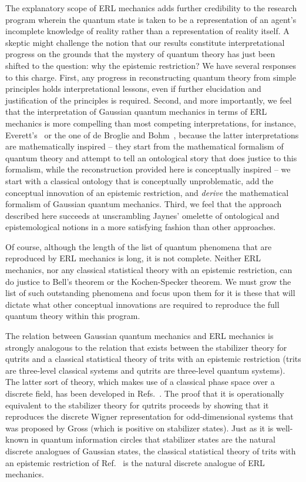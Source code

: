\documentclass[pra,superscriptaddress,nofootinbib,12pt]{revtex4-2}
\begin{document}
The explanatory scope of ERL mechanics adds further credibility to the research program wherein the quantum state is taken to be a representation of an agent's incomplete knowledge of reality rather than a representation of reality itself. A skeptic might challenge the notion that our results constitute interpretational progress on the grounds that the mystery of quantum theory has just been shifted to the question: why the epistemic restriction?  We have several responses to this charge.  First, any progress in reconstructing quantum theory from simple principles holds interpretational lessons, even if further elucidation and justification of the principles is required.  Second, and more importantly, we feel that the interpretation of Gaussian quantum mechanics in terms of ERL mechanics is more compelling than most competing interpretations, for instance, Everett's~\cite{Everett} or the one of de Broglie and Bohm~\cite{Bohmian}, because the latter interpretations are mathematically inspired -- they start from the mathematical formalism of quantum theory and attempt to tell an ontological story that does justice to this formalism, while the reconstruction provided here is conceptually inspired -- we start with a classical ontology that is conceptually unproblematic, add the conceptual innovation of an epistemic restriction, and \emph{derive} the mathematical formalism of Gaussian quantum mechanics.  Third, we feel that the approach described here succeeds at unscrambling  Jaynes' omelette of ontological and epistemological notions in a more satisfying fashion than other approaches.

Of course, although the length of the list of quantum phenomena that are reproduced by ERL mechanics is long, it is not complete. Neither ERL mechanics, nor any classical statistical theory with an epistemic restriction, can do justice to Bell's theorem or the Kochen-Specker theorem.  We must grow the list of such outstanding phenomena and focus upon them for it is these that will dictate what other conceptual innovations are required to reproduce the full quantum theory within this program.

The relation between Gaussian quantum mechanics and ERL mechanics is strongly analogous to the relation that exists between the stabilizer theory for qutrits \cite{Got01} and a classical statistical theory of trits with an epistemic restriction (trits are three-level classical systems and qutrits are three-level quantum systems). The latter sort of theory, which makes use of a classical phase space over a discrete field, has been developed in Refs.~\cite{SchreiberSpekunpublished,EdwardsCoeckeSpekkens}. The proof that it is operationally equivalent to the stabilizer theory for qutrits proceeds by showing that it reproduces the discrete Wigner representation for odd-dimensional systems that was proposed by Gross \cite{Gross} (which is positive on stabilizer states).  Just as it is well-known in quantum information circles that stabilizer states are the natural discrete analogues of Gaussian states, the classical statistical theory of trits with an epistemic restriction of Ref.~\cite{SchreiberSpekunpublished} is the natural discrete analogue of ERL mechanics.
\end{document}
